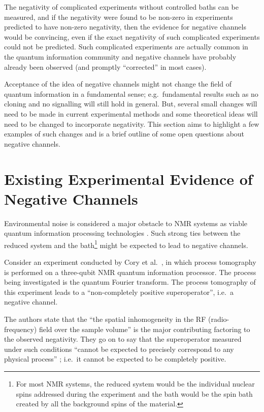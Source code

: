 The negativity of complicated experiments without controlled baths can be measured, and if the negativity were found to be non-zero in experiments predicted to have non-zero negativity, then the evidence for negative channels would be convincing, even if the exact negativity of such complicated experiments could not be predicted.  Such complicated experiments are actually common in the quantum information community and negative channels have probably already been observed (and promptly ``corrected'' in most cases).

Acceptance of the idea of negative channels might not change the field of quantum information in a fundamental sense; e.g.\ fundamental results such as no cloning and no signalling will still hold in general.  But, several small changes will need to be made in current experimental methods and some theoretical ideas will need to be changed to incorporate negativity.  This section aims to highlight a few examples of such changes and is a brief outline of some open questions about negative channels.

\section{Existing Experimental Evidence of Negative Channels}
\label{sec:Havel}

Environmental noise is considered a major obstacle to NMR systems as viable quantum information processing technologies \cite{Boulant2004}.  Such strong ties between the reduced system and the bath\footnote{For most NMR systems, the reduced system would be the individual nuclear spins addressed during the experiment and the bath would be the spin bath created by all the background spins of the material.} might be expected to lead to negative channels.

Consider an experiment conducted by Cory et al.\ \cite{Cory2004}, in which process tomography is performed on a three-qubit NMR quantum information processor.  The process being investigated is the quantum Fourier transform.  The process tomography of this experiment leads to a ``non-completely positive superoperator'', i.e.\ a negative channel.  

The authors state that the ``the spatial inhomogeneity in the RF (radio-frequency) field over the sample volume'' \cite{Cory2004} is the major contributing factoring to the observed negativity.  They go on to say that the superoperator measured under such conditions ``cannot be expected to precisely correspond to any physical process'' \cite{Cory2004}; i.e.\ it cannot be expected to be completely positive.    

